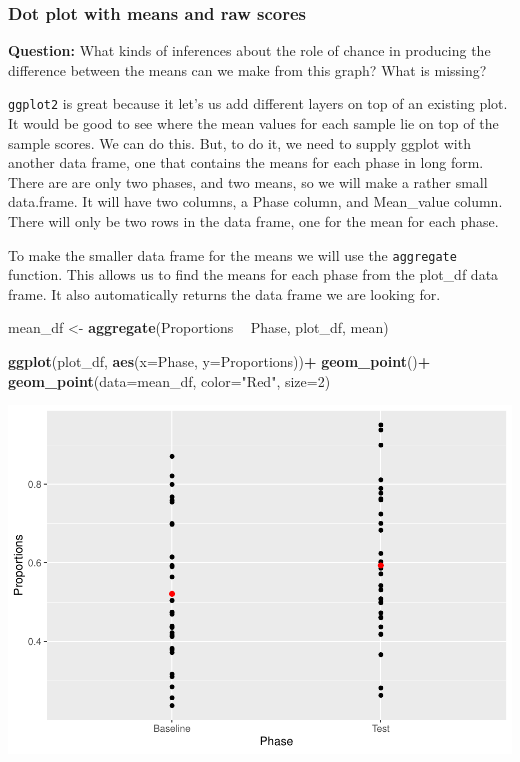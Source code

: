 \documentclass[]{book}
\newenvironment{Shaded}{\begin{snugshade}}{\end{snugshade}}
\newcommand{\KeywordTok}[1]{\textcolor[rgb]{0.13,0.29,0.53}{\textbf{#1}}}
\newcommand{\DataTypeTok}[1]{\textcolor[rgb]{0.13,0.29,0.53}{#1}}
\newcommand{\DecValTok}[1]{\textcolor[rgb]{0.00,0.00,0.81}{#1}}
\newcommand{\StringTok}[1]{\textcolor[rgb]{0.31,0.60,0.02}{#1}}
\newcommand{\OperatorTok}[1]{\textcolor[rgb]{0.81,0.36,0.00}{\textbf{#1}}}
\newcommand{\NormalTok}[1]{#1}
\begin{document}
\subsubsection{Dot plot with means and raw
scores}\label{dot-plot-with-means-and-raw-scores}

\textbf{Question:} What kinds of inferences about the role of chance in
producing the difference between the means can we make from this graph?
What is missing?

\texttt{ggplot2} is great because it let's us add different layers on
top of an existing plot. It would be good to see where the mean values
for each sample lie on top of the sample scores. We can do this. But, to
do it, we need to supply ggplot with another data frame, one that
contains the means for each phase in long form. There are are only two
phases, and two means, so we will make a rather small data.frame. It
will have two columns, a Phase column, and Mean\_value column. There
will only be two rows in the data frame, one for the mean for each
phase.

To make the smaller data frame for the means we will use the
\texttt{aggregate} function. This allows us to find the means for each
phase from the plot\_df data frame. It also automatically returns the
data frame we are looking for.

\begin{Shaded}
\begin{Highlighting}[]
\NormalTok{mean_df <-}\StringTok{ }\KeywordTok{aggregate}\NormalTok{(Proportions }\OperatorTok{~}\StringTok{ }\NormalTok{Phase, plot_df, mean)}

\KeywordTok{ggplot}\NormalTok{(plot_df, }\KeywordTok{aes}\NormalTok{(}\DataTypeTok{x=}\NormalTok{Phase, }\DataTypeTok{y=}\NormalTok{Proportions))}\OperatorTok{+}\StringTok{ }
\StringTok{  }\KeywordTok{geom_point}\NormalTok{()}\OperatorTok{+}
\StringTok{  }\KeywordTok{geom_point}\NormalTok{(}\DataTypeTok{data=}\NormalTok{mean_df, }\DataTypeTok{color=}\StringTok{"Red"}\NormalTok{, }\DataTypeTok{size=}\DecValTok{2}\NormalTok{)}
\end{Highlighting}
\end{Shaded}

\includegraphics{Statistics_Lab_files/figure-latex/unnamed-chunk-174-1.pdf}
\end{document}
